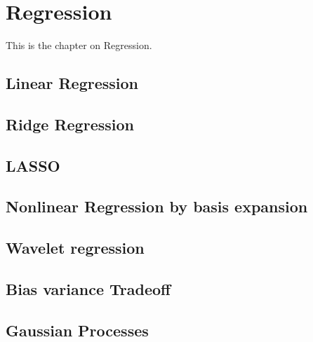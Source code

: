 \documentclass[MachineLearning]{subfiles}
\begin{document}
\section{Regression}
This is the chapter on Regression.
\subsection{Linear Regression}
\subsection{Ridge Regression}
\subsection{LASSO}
\subsection{Nonlinear Regression by basis expansion}
\subsection{Wavelet regression}
\subsection{Bias variance Tradeoff}
\subsection{Gaussian Processes}
\end{document}
